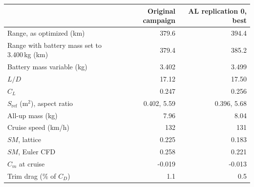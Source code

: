 \begin{tabular}{@{}lrr@{}}
\toprule
 & Original campaign & AL replication 0, best \\
\midrule
Range, as optimized (km) & 379.6 & 394.4 \\
Range with battery mass set to 3.400\,kg (km) & 379.4 & 385.2 \\
Battery mass variable (kg) & 3.402 & 3.499 \\
$L/D$ & 17.12 & 17.50 \\
$C_L$ & 0.247 & 0.256 \\
$S_\mathrm{ref}$ (m$^2$), aspect ratio & 0.402, 5.59 & 0.396, 5.68 \\
All-up mass (kg) & 7.96 & 8.04 \\
Cruise speed (km/h) & 132 & 131 \\
$SM$, lattice & 0.225 & 0.183 \\
$SM$, Euler CFD & 0.258 & 0.221 \\
$C_m$ at cruise & -0.019 & -0.013 \\
Trim drag (\% of $C_D$) & 1.1 & 0.5 \\
\bottomrule
\end{tabular}
